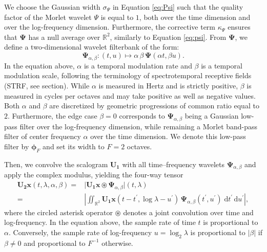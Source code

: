 \documentclass{bmcart}
\newcommand{\lnameref}[1]{%
\bgroup
\let\nmu\MakeLowercase
\nameref{#1}\egroup}
\newcommand{\nmu}{}
\begin{document}
We choose the Gaussian width $\sigma_{\Psi}$ in Equation \ref{eq:Psi} such that the quality factor of the Morlet wavelet $\Psi$ is equal to $1$, both over the time dimension and over the log-frequency dimension.
Furthermore, the corrective term $\kappa_{\Psi}$ ensures that $\boldsymbol{\Psi}$ has a null average over $\mathbb{R}^2$, similarly to Equation \ref{eq:psi}.
From $\mathbf{\Psi}$, we define a two-dimensional wavelet filterbank of the form:
\begin{equation}
\mathbf{\Psi}_{\alpha,\beta} : (t, u) \longmapsto
\alpha \, \beta \, \mathbf{\Psi}(\alpha t, \beta u).
\end{equation}
In the equation above, $\alpha$ is a temporal modulation rate and $\beta$ is a temporal modulation scale, following the terminology of spectrotemporal receptive fields (STRF, see \lnameref{sec:related-work} section).
While $\alpha$ is measured in Hertz and is strictly positive, $\beta$ is measured in cycles per octaves and may take positive as well as negative values.
Both $\alpha$ and $\beta$ are discretized by geometric progressions of common ratio equal to $2$.
Furthermore, the edge case $\beta=0$ corresponds to $\mathbf{\Psi}_{\alpha,\beta}$ being a Gaussian low-pass filter over the log-frequency dimension, while remaining a Morlet band-pass filter of center frequency $\alpha$ over the time dimension.
We denote this low-pass filter by $\boldsymbol{\phi}_F$ and set its width to $F=2$ octaves.

Then, we convolve the scalogram $\mathbf{U_1}$ with all time--frequency wavelets $\mathbf{\Psi}_{\alpha,\beta}$ and apply the complex modulus, yielding the four-way tensor
\begin{align}
\mathbf{U_2}\boldsymbol{x} (t, \lambda, \alpha, \beta)
=&
\big \vert
\mathbf{U_1}\boldsymbol{x} \circledast \boldsymbol{\Psi}_{\alpha,\beta}
\big \vert (t, \lambda)
\nonumber \\
=&
\left\vert
\iint_{\mathbb{R}^2}
\mathbf{U_1}\boldsymbol{x}(t - t^\prime, \log \lambda - u^\prime)\,
\boldsymbol{\Psi}_{\alpha,\beta}(t^\prime, u^\prime)\;
\mathrm{d}t^\prime \, \mathrm{d}u^\prime
\right\vert,
\label{eq:U2}
\end{align}
where the circled asterisk operator $\circledast$ denotes a joint convolution over time and log-frequency.
In the equation above, the sample rate of time $t$ is proportional to $\alpha$.
Conversely, the sample rate of log-frequency $u = \log_2 \lambda$ is proportional to $\vert\beta\vert$ if $\beta \neq 0$ and proportional to $F^{-1}$ otherwise.
\end{document}
